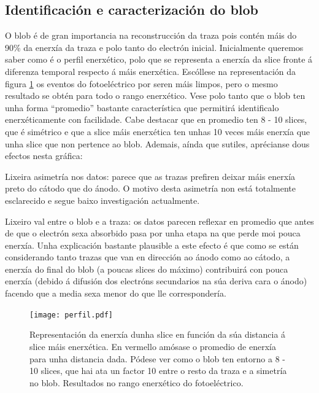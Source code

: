 \documentclass[a4paper,12pt]{article}
\begin{document}


\subsection{Identificación e caracterización do blob}\label{blob}

O blob é de gran importancia na reconstrucción da traza pois contén máis do 90\% da enerxía da traza e polo tanto do electrón inicial. Inicialmente queremos saber como é o perfil enerxético, polo que se representa a enerxía da slice fronte á diferenza temporal respecto á máis enerxética. Escóllese na representación da figura \ref{perfil} os eventos do fotoeléctrico por seren máis limpos, pero o mesmo resultado se obtén para todo o rango enerxético. Vese polo tanto que o blob ten unha forma ``promedio'' bastante característica que permitirá identificalo enerxéticamente con facilidade. Cabe destacar que en promedio ten 8 - 10 slices, que é simétrico e que a slice máis enerxética ten unhas 10 veces máis enerxía que unha slice que non pertence ao blob. Ademais, aínda que sutiles, aprécianse dous efectos nesta gráfica:

\bi
\item Lixeira asimetría nos datos: parece que as trazas prefiren deixar máis enerxía preto do cátodo que do ánodo. O motivo desta asimetría non está totalmente esclarecido e segue baixo investigación actualmente.
\item Lixeiro val entre o blob e a traza: os datos parecen reflexar en promedio que antes de que o electrón sexa absorbido pasa por unha etapa na que perde moi pouca enerxía. Unha explicación bastante plausible a este efecto é que como se están considerando tanto trazas que van en dirección ao ánodo como ao cátodo, a enerxía do final do blob (a poucas slices do máximo) contribuirá con pouca enerxía (debido á difusión dos electróns secundarios na súa deriva cara o ánodo) facendo que a media sexa menor do que lle correspondería.
\ei

\begin{figure}[!]
\centering
\texttt{[image: perfil.pdf]}
\caption{Representación da enerxía dunha slice en función da súa distancia á slice máis enerxética. En vermello amósase o promedio de enerxía para unha distancia dada. Pódese ver como o blob ten entorno a 8 - 10 slices, que hai ata un factor 10 entre o resto da traza e a simetría no blob. Resultados no rango enerxético do fotoeléctrico.}
\label{perfil}
\end{figure}
\end{document}
